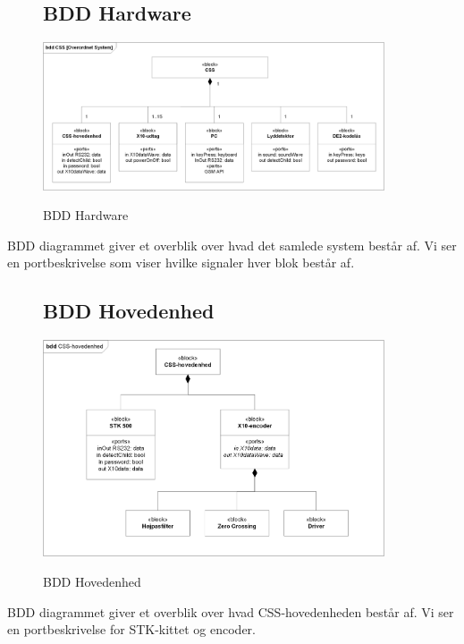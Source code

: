 \begin{figure}[!htbp] \centering
\subsection{BDD Hardware}
{\includegraphics[width=0.9\textwidth]{billeder/diagrammer/BDD_Hardware}}
\caption{BDD Hardware}
\label{lab:bddhardware}
\raggedright
\end{figure}
BDD diagrammet giver et overblik over hvad det samlede system består af. Vi ser en portbeskrivelse som viser hvilke signaler hver blok består af.

\begin{figure}[!htbp] \centering
\subsection{BDD Hovedenhed}
{\includegraphics[width=0.9\textwidth]{billeder/diagrammer/BDD_Hovedenhed}}
\caption{BDD Hovedenhed}
\label{lab:bddhovedenhed}
\raggedright
\end{figure}
BDD diagrammet giver et overblik over hvad CSS-hovedenheden består af. Vi ser en portbeskrivelse for STK-kittet og encoder. 

